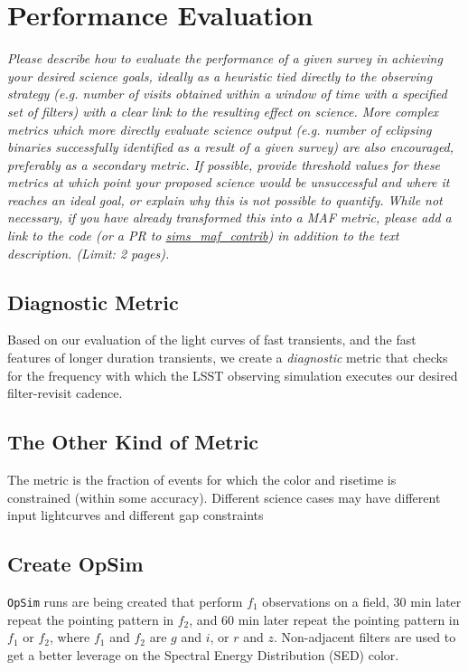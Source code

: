 \documentclass[12pt, letterpaper]{article}
\begin{document}
\section{Performance Evaluation}
\begin{footnotesize}
{\it Please describe how to evaluate the performance of a given survey in achieving your desired science goals, ideally as a heuristic tied directly to the observing strategy (e.g. number of visits obtained within a window of time with a specified set of filters) with a clear link to the resulting effect on science. More complex metrics which more directly evaluate science output (e.g. number of eclipsing binaries successfully identified as a result of a given survey) are also encouraged, preferably as a secondary metric. If possible, provide threshold values for these metrics at which point your proposed science would be unsuccessful and where it reaches an ideal goal, or explain why this is not possible to quantify. While not necessary, if you have already transformed this into a MAF metric, please add a link to the code (or a PR to \href{https://github.com/lsst-nonproject/sims_maf_contrib}{sims\_maf\_contrib}) in addition to the text description. (Limit: 2 pages).}
\end{footnotesize}

\subsection{Diagnostic Metric}

Based on our evaluation of the light curves of fast transients, and the fast features of longer duration transients, we create a {\it diagnostic} metric that checks for the frequency with which the LSST observing simulation executes our desired filter-revisit cadence. 

\subsection{The Other Kind of Metric}

The metric is the fraction of events for which the color and risetime is constrained (within some accuracy). Different science cases may have different input lightcurves and different gap constraints


\subsection{Create OpSim}

{\tt OpSim} runs are being created that perform $f_1$ observations on a field, 30 min later repeat the pointing pattern in $f_2$, and 60 min later repeat the pointing pattern in $f_1$ or $f_2$, where $f_1$ and $f_2$ are $g$ and $i$, or $r$ and $z$. Non-adjacent filters are used to get a better leverage on the Spectral Energy Distribution (SED) color.
\end{document}
